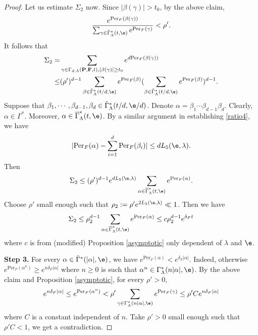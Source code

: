 \documentclass[11pt]{amsart}
\theoremstyle{definition}
\def\a{\alpha}
\def\b{\beta}
\def\c{\gamma}   \def\C{\Gamma}
\def\d{\delta}   %
\def\l{\lambda}   \def\L{\Lambda}
\def\bP{\textbf{P}}
\def\bF{\textbf{F}}
\newcommand{\Per}{\mathrm{Per}}
\begin{document}
\begin{proof}
Let us estimate $\Sigma_2$ now. Since $|\b(\c)|>t_0$, by the above claim,
\[\frac{e^{\Per_F(\b(\c))}}{\sum_{\c\in \tilde\C^*_\L(t,\e)}e^{\Per_F(\c)}}<\rho'.\]
It follows that
\begin{equation*}
\begin{aligned}
\Sigma_2=&\sum_{\c \in \C_{d,\L}(\bP, \bF, t), |\b(\c)|\ge t_0}e^{d\Per_F(\b(\c))}\\
\le &(\rho')^{d-1}\sum_{\b \in  \tilde\C^*_\L(t/d,\e)}e^{\Per_F(\b)}(\sum_{\b \in  \tilde\C^*_\L(t/d,\e)}e^{\Per_F(\b)})^{d-1}.
\end{aligned}
\end{equation*}
Suppose that $\b_1,\cdots,\b_{d-1},\b_{d}\in \tilde\C^*_\L(t/d,\e/d)$. Denote $\a=\b_1\cdots\b_{d-1}\b_{d}.$  Clearly, $\a\in \C^*$. Moreover, $\a\in \overline\C^*_\L(t,\e)$. 
By a similar argument in establishing \eqref{ratio4}, we have
$$|\Per_F(\a)- \sum_{i=1}^d\Per_F(\b_i)|\le d L_5(\e,\l).$$
Then 
\begin{equation*}
\begin{aligned}
\Sigma_2\le (\rho')^{d-1}e^{dL_5(\e,\l)}\sum_{\a \in  \overline\C^*_\L(t,\e)}e^{\Per_F(\a)}.
\end{aligned}
\end{equation*}
Choose $\rho'$ small enough such that $ \rho_2:=\rho'e^{2L_5(\e,\l)}\ll1$. Then we have
\begin{equation}\label{sigma2}
\begin{aligned}
\Sigma_2\le \rho_2^{d-1}\sum_{\a \in  \overline\C^*_\L(t,\e)}e^{\Per_F(\a)} \le c\rho_2^{d-1}e^{\d_Ft}
\end{aligned}
\end{equation}
where $c$ is from (modified) Proposition \ref{asymptotic} only dependent of $\l$ and $\e$. 

\textbf{Step 3.} 
For every $\a\in \tilde\C^*(|\a|,\e)$, we have $e^{\Per_F(\a)}<e^{\d_F|\a|}$. Indeed, otherwise  $e^{\Per_F(\a^n)}\ge e^{n\d_F|\a|}$ where $n\ge 0$ is such that $\a^n\in \C_\L^*(n|\a|,\e)$.
 By the above claim and Proposition \ref{asymptotic}, for every $\rho'>0$, 
\[e^{n\d_F|\a|}\le e^{\Per_F(\a^n)}<\rho'\sum_{\c\in \C^*_\L(n|\a|,\e)}e^{\Per_F(\c)}\le \rho'Ce^{n\d_F|\a|}\]
where $C$ is a constant independent of $n$. Take $\rho'>0$ small enough such that $\rho'C<1$, we get a contradiction. 

\end{proof}
\end{document}
